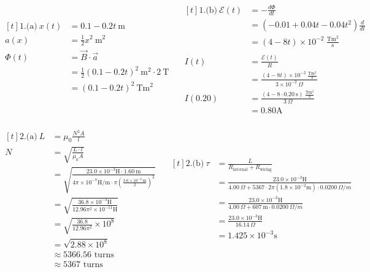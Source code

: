 \documentclass[11pt]{article}
\begin{document}
\newpage
\begin{align*}
\begin{aligned}[t]
\text{1.(a)} \ 
x(t) &= 0.1 - 0.2 t \ \mathrm{m} \\
a(x) &= \frac{1}{2} x^{2}\  \mathrm{m^2} \\
\Phi(t) &= \vec{B} \cdot \vec{a} \\
  &= \frac{1}{2} (0.1 - 0.2t)^2 \ \mathrm{m^2}  \cdot 2 \ \mathrm{T} \\
  &= (0.1 - 0.2t)^2 \ \mathrm{T} \mathrm{m^2} \\
\end{aligned}
\quad
\begin{aligned}[t]
\text{1.(b)} \ 
\mathcal{E}(t) &= - \frac{d\Phi}{dt} \\
  &= (- 0.01 + 0.04t - 0.04t^2) \frac{d}{dt} \\
  &= (4 - 8t) \times 10^{-2} \ \mathrm{\tfrac{Tm^2}{s}} \\ \\
I(t) &= \frac{\mathcal{E}(t)}{R} \\
  &= \frac{(4 - 8t) \times 10^{-2} \ \mathrm{\frac{Tm^2}{s}}}{3 \times 10^{-2} \ \Omega} \\
I(0.20) &= \frac{(4 - 8 \cdot 0.20 \ \mathrm{s}) \ \mathrm{\frac{Tm^2}{s}}}{3 \ \Omega} \\
  &= 0.80 \mathrm{A}
\end{aligned}
\end{align*}



\begin{align*}
\begin{aligned}[t]
\text{2.(a)} \ 
L &= \mu_0 \frac{N^2A}{l} \\
N &= \sqrt{ \frac{L \cdot l}{\mu_0 A} } \\
  &= \sqrt{ \frac{23.0 \times 10^{-3} \mathrm{H} \cdot 1.60 \ \mathrm{m}}{4\pi \times 10^{-7} \mathrm{H/m} \cdot \pi (\frac{3.6 \times 10^{-2} \ \mathrm{m}}{2})^2} } \\
  &= \sqrt{ \frac{36.8 \times 10^{-3} \mathrm{H}}{12.96 \pi^2 \times 10^{-11} \mathrm{H}} } \\
  &= \sqrt{ \frac{36.8}{12.96 \pi^2} \times 10^{8} } \\
  &= \sqrt{ 2.88 \times 10^{8} } \\
  &\approx 5366.56 \text{ turns} \\
  &\approx 5367 \text{ turns}
\end{aligned}
\quad
\begin{aligned}[t]
\text{2.(b)} \ 
\tau &= \frac{L}{R_{\mathrm{internal}} + R_{\mathrm{wiring}}} \\
  &= \frac{23.0 \times 10^{-3} \mathrm{H}}{4.00 \ \Omega + 5367 \cdot 2\pi (1.8 \times 10^{-2} \mathrm{m}) \cdot 0.0200 \ \Omega/m} \\
  &= \frac{23.0 \times 10^{-3} \mathrm{H}}{4.00 \ \Omega + 607 \ \mathrm{m} \cdot 0.0200 \ \Omega/m} \\
  &= \frac{23.0 \times 10^{-3} \mathrm{H}}{16.14 \ \Omega} \\
  &= 1.425 \times 10^{-3} \mathrm{s}
\end{aligned}
\end{align*}
\end{document}
